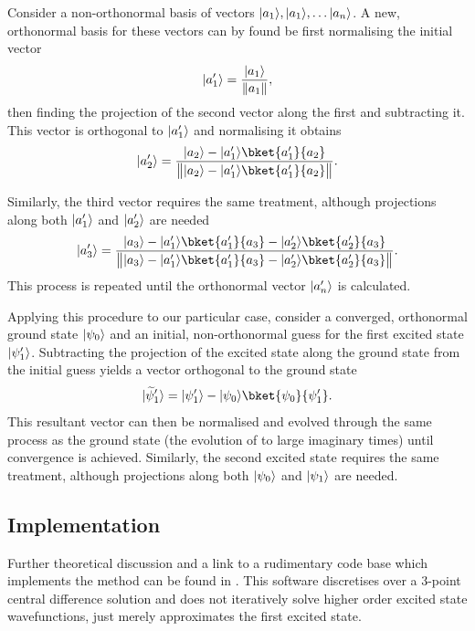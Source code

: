 Consider a non-orthonormal basis of vectors $\lvert a_1\rangle, \lvert a_1\rangle, \ldots \lvert a_n\rangle$.
A new, orthonormal basis for these vectors can by found be first normalising the initial vector
\begin{equation}
\lvert a^\prime_1\rangle = \frac{\lvert a_1\rangle}{\lVert a_1\rVert},
\end{equation}
then finding the projection of the second vector along the first and subtracting it.
This vector is orthogonal to $\lvert a^\prime_1\rangle$ and normalising it obtains
\begin{equation}
\ket{a^\prime_2} = \frac{\ket{a_2}-\ket{a^\prime_1}\bket{a^\prime_1}{a_2}}{\norm[\big]{\ket{a_2}-\ket{a^\prime_1}\bket{a^\prime_1}{a_2}}}.
\end{equation}

Similarly, the third vector requires the same treatment, although projections along both $\lvert a^\prime_1\rangle$ and $\lvert a^\prime_2\rangle$ are needed
\begin{equation}
\ket{a^\prime_3} = \frac{\ket{a_3}-\ket{a^\prime_1}\bket{a^\prime_1}{a_3}-\ket{a^\prime_2}\bket{a^\prime_2}{a_3}}{\norm[\big]{\ket{a_3}-\ket{a^\prime_1}\bket{a^\prime_1}{a_3}-\ket{a^\prime_2}\bket{a^\prime_2}{a_3}}}.\label{eq:gs3ex}
\end{equation}
This process is repeated until the orthonormal vector $\lvert a^\prime_n\rangle$ is calculated.

Applying this procedure to our particular case, consider a converged, orthonormal ground state $\lvert\psi_0\rangle$ and an initial, non-orthonormal guess for the first excited state $\lvert\psi^\prime_1\rangle$.
Subtracting the projection of the excited state along the ground state from the initial guess yields a vector orthogonal to the ground state
\begin{equation}
\lvert\widetilde{\psi}^\prime_1\rangle = \ket{\psi^\prime_1}-\ket{\psi_0}\bket{\psi_0}{\psi^\prime_1}.
\end{equation}
This resultant vector can then be normalised and evolved through the same process as the ground state (\ie the evolution of  to large imaginary times) until convergence is achieved.
Similarly, the second excited state requires the same treatment, although projections along both $\lvert\psi_0\rangle$ and $\lvert\psi_1\rangle$ are needed.

\subsection{Implementation}

Further theoretical discussion and a link to a rudimentary code base which implements the method can be found in .
This software discretises over a 3-point central difference solution and does not iteratively solve higher order excited state wavefunctions, just merely approximates the first excited state.

